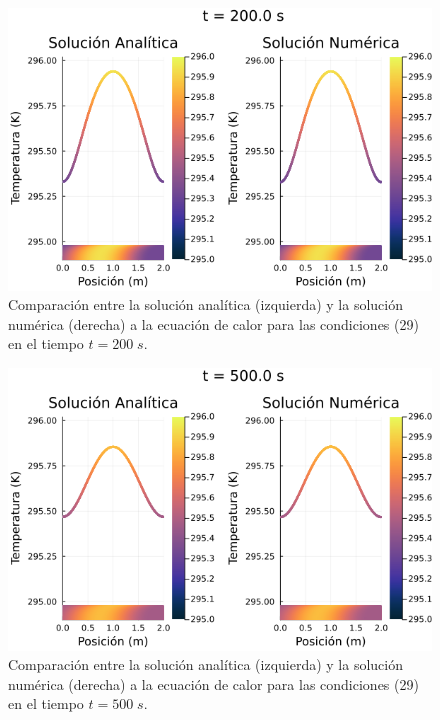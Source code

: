 \documentclass[12pt]{article}
\begin{document}
\begin{figure}[H]
\begin{center}
    \includegraphics[width=0.79\linewidth]{Ejemplo_02_t_1.png}
    \caption{Comparación entre la solución analítica (izquierda) y la solución numérica (derecha) a la ecuación de calor para las condiciones (29) en el tiempo $t=200 \; s$.}
\end{center}
\end{figure}

\begin{figure}[H]
\begin{center}
    \includegraphics[width=0.79\linewidth]{Ejemplo_02_t_2.png}
    \caption{Comparación entre la solución analítica (izquierda) y la solución numérica (derecha) a la ecuación de calor para las condiciones (29) en el tiempo $t=500 \; s$.}
\end{center}
\end{figure}
\end{document}
